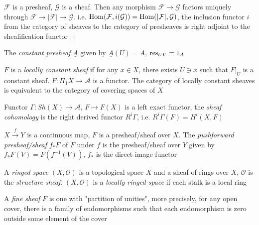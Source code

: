 \documentclass[main]{subfiles}
\begin{document}
\begin{proposition}
$\mathcal F$ is a presheaf, $\mathcal G$ is a sheaf. Then any morphism $\mathcal F\to\mathcal G$ factors uniquely through $\mathcal F\to|\mathcal F|\to\mathcal G$. i.e. $\operatorname{Hom}(\mathcal F,i(\mathcal G))=\operatorname{Hom}(|\mathcal F|,\mathcal G)$, the inclusion functor $i$ from the category of sheaves to the category of presheaves is right adjoint to the sheafification functor $|\cdot|$
\end{proposition}

\begin{definition}
The \textit{constant presheaf} $\underline A$ given by $\underline A(U)=A$, $\operatorname{res}_{UV}=1_A$ \par
$F$ is a \textit{locally constant sheaf} if for any $x\in X$, there exists $U\ni x$ such that $F|_U$ is a constant sheaf. $F:\Pi_1X\to \mathscr A$ is a functor. The category of locally constant sheaves is equivalent to the category of covering spaces of $X$
\end{definition}

\begin{definition}
Functor $\Gamma:Sh(X)\to\mathscr A$, $F\mapsto F(X)$ is a left exact functor, the \textit{sheaf cohomology} is the right derived functor $R^i\Gamma$, i.e. $R^i\Gamma(F)=H^i(X,F)$
\end{definition}

\begin{definition}
$X\xrightarrow f Y$ is a continuous map, $F$ is a presheaf/sheaf over $X$. The \textit{pushforward presheaf/sheaf} $f_*F$ of $F$ under $f$ is the presheaf/sheaf over $Y$ given by $f_*F(V)=F(f^{-1}(V))$, $f_*$ is the direct image functor
\end{definition}

\begin{definition}
A \textit{ringed space} $(X,\mathcal O)$ is a topological space $X$ and a sheaf of rings over $X$, $\mathcal O$ is the \textit{structure sheaf}. $(X,\mathcal O)$ is a \textit{locally ringed space} if each stalk is a local ring
\end{definition}

\begin{definition}
A \textit{fine sheaf} $F$ is one with "partition of unities", more precisely, for any open cover, there is a family of endomorphisms such that each endomorphism is zero outside some element of the cover
\end{definition}
\end{document}
